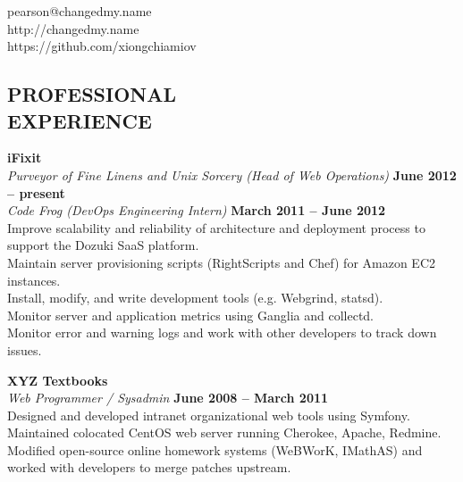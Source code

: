 \documentclass[margin,line]{resume}
\begin{document}
{
    \sc
    \hfill pearson@changedmy.name           \vspace{0mm}\\\vspace{0mm}%
    \hfill http://changedmy.name            \vspace{0mm}\\\vspace{0mm}%
    \hfill https://github.com/xiongchiamiov \vspace{0mm}\\\vspace{-9mm}%
}

\begin{resume}

\vspace{6mm}

    \section{\mysidestyle \textbf{\large{P}\small{ROFESSIONAL\\EXPERIENCE}}}

    \textbf{\listing iFixit} \vspace{2mm}\\\vspace{1mm}%
    \textsl{Purveyor of Fine Linens and Unix Sorcery (Head of Web Operations)} \hfill \textbf{June 2012 -- present}\\
    \textsl{Code Frog (DevOps Engineering Intern)} \hfill \textbf{March 2011 -- June 2012}\\
    Improve scalability and reliability of architecture and deployment process to support the Dozuki SaaS platform.\\
    Maintain server provisioning scripts (RightScripts and Chef) for Amazon EC2 instances.\\
    Install, modify, and write development tools (e.g. Webgrind, statsd).\\
    Monitor server and application metrics using Ganglia and collectd.\\
    Monitor error and warning logs and work with other developers to track down issues.

    \textbf{\listing XYZ Textbooks} \vspace{2mm}\\\vspace{1mm}%
    \textsl{Web Programmer / Sysadmin} \hfill \textbf{June 2008 -- March 2011}\\
    Designed and developed intranet organizational web tools using Symfony.\\
    Maintained colocated CentOS web server running Cherokee, Apache, Redmine.\\
    Modified open-source online homework systems (WeBWorK, IMathAS) and worked with developers to merge patches upstream.
    

\end{resume}
\end{document}
